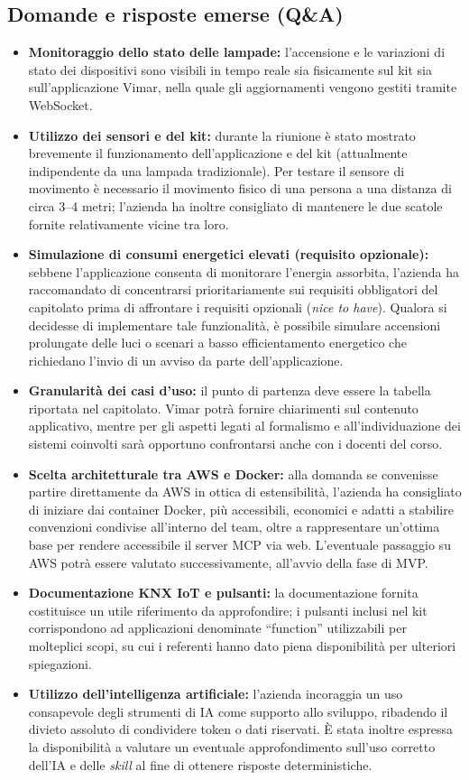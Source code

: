 \documentclass[11pt, a4paper]{article}
\begin{document}
\subsection{Domande e risposte emerse (Q\&A)}
\begin{itemize}
    \item \textbf{Monitoraggio dello stato delle lampade:} l'accensione e le variazioni di stato dei dispositivi sono visibili in tempo reale sia fisicamente sul kit sia sull'applicazione Vimar, nella quale gli aggiornamenti vengono gestiti tramite WebSocket.
    \item \textbf{Utilizzo dei sensori e del kit:} durante la riunione è stato mostrato brevemente il funzionamento dell'applicazione e del kit (attualmente indipendente da una lampada tradizionale). Per testare il sensore di movimento è necessario il movimento fisico di una persona a una distanza di circa 3--4 metri; l'azienda ha inoltre consigliato di mantenere le due scatole fornite relativamente vicine tra loro.
    \item \textbf{Simulazione di consumi energetici elevati (requisito opzionale):} sebbene l'applicazione consenta di monitorare l'energia assorbita, l'azienda ha raccomandato di concentrarsi prioritariamente sui requisiti obbligatori del capitolato prima di affrontare i requisiti opzionali (\emph{nice to have}). Qualora si decidesse di implementare tale funzionalità, è possibile simulare accensioni prolungate delle luci o scenari a basso efficientamento energetico che richiedano l'invio di un avviso da parte dell'applicazione.
    \item \textbf{Granularità dei casi d'uso:} il punto di partenza deve essere la tabella riportata nel capitolato. Vimar potrà fornire chiarimenti sul contenuto applicativo, mentre per gli aspetti legati al formalismo e all'individuazione dei sistemi coinvolti sarà opportuno confrontarsi anche con i docenti del corso.
    \item \textbf{Scelta architetturale tra AWS e Docker:} alla domanda se convenisse partire direttamente da AWS in ottica di estensibilità, l'azienda ha consigliato di iniziare dai container Docker, più accessibili, economici e adatti a stabilire convenzioni condivise all'interno del team, oltre a rappresentare un'ottima base per rendere accessibile il server MCP via web. L'eventuale passaggio su AWS potrà essere valutato successivamente, all'avvio della fase di MVP.\newpage
    \item \textbf{Documentazione KNX IoT e pulsanti:} la documentazione fornita costituisce un utile riferimento da approfondire; i pulsanti inclusi nel kit corrispondono ad applicazioni denominate ``function'' utilizzabili per molteplici scopi, su cui i referenti hanno dato piena disponibilità per ulteriori spiegazioni.
    \item \textbf{Utilizzo dell'intelligenza artificiale:} l'azienda incoraggia un uso consapevole degli strumenti di IA come supporto allo sviluppo, ribadendo il divieto assoluto di condividere token o dati riservati. È stata inoltre espressa la disponibilità a valutare un eventuale approfondimento sull'uso corretto dell'IA e delle \emph{skill} al fine di ottenere risposte deterministiche.
\end{itemize}
\end{document}
